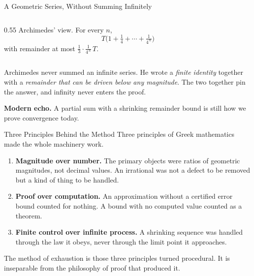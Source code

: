\documentclass[aspectratio=169]{beamer}
\begin{document}
\begin{frame}{A Geometric Series, Without Summing Infinitely}
\begin{columns}
\begin{column}{0.55\textwidth}
                        Archimedes' view. For every $n$,
                        \[
                                T\Big(1 + \tfrac{1}{4} + \cdots
                                + \tfrac{1}{4^{\,n}}\Big)
                        \]
                        with remainder at most
                        $\tfrac{1}{3}\cdot\tfrac{1}{4^{\,n}}\,T$.
                \end{column}
        \end{columns}

        Archimedes never summed an infinite series. He wrote a
        \emph{finite identity} together with a \emph{remainder that
        can be driven below any magnitude}. The two together pin the
        answer, and infinity never enters the proof.

        \vspace{0.2cm}
        \textcolor{TealThr}{\textbf{Modern echo.}} A partial sum
        with a shrinking remainder bound is still how we prove
        convergence today.
\end{frame}


\begin{frame}{Three Principles Behind the Method}
        Three principles of Greek mathematics made the whole machinery work.

        \vspace{0.4cm}
        \begin{enumerate}
                \item \textbf{Magnitude over number.} The primary
                        objects were ratios of geometric magnitudes,
                        not decimal values. An irrational was not a
                        defect to be removed but a kind of thing to
                        be handled.

                        \vspace{0.15cm}
                \item \textbf{Proof over computation.} An
                        approximation without a certified error
                        bound counted for nothing. A bound with no
                        computed value counted as a theorem.

                        \vspace{0.15cm}
                \item \textbf{Finite control over infinite process.}
                        A shrinking sequence was handled through the
                        law it obeys, never through the limit point
                        it approaches.
        \end{enumerate}

        \vspace{0.3cm}
        The method of exhaustion is those three principles turned
        procedural. It is inseparable from the philosophy of proof
        that produced it.
\end{frame}
\end{document}
